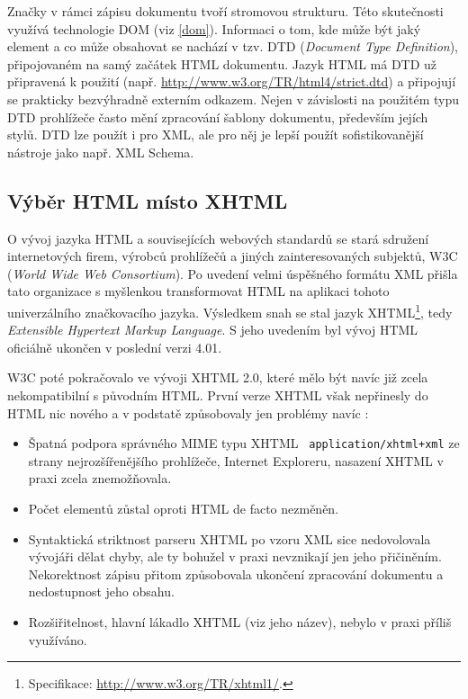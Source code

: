 Značky v rámci zápisu dokumentu tvoří stromovou strukturu. Této
skutečnosti využívá technologie DOM (viz \ref{dom}). Informaci
o tom, kde může být jaký element a co může obsahovat se nachází v
tzv. DTD ({\it Document Type Definition}), připojovaném na samý
začátek HTML dokumentu. Jazyk HTML má DTD už připravená k použití
(např. \url{http://www.w3.org/TR/html4/strict.dtd}) a připojují se
prakticky bezvýhradně externím odkazem. Nejen v závislosti na
použitém typu DTD prohlížeče často mění zpracování šablony dokumentu,
především jejích stylů. DTD lze použít i pro XML, ale pro něj je lepší
použít sofistikovanější nástroje jako např. XML Schema. 

\subsection{Výběr HTML místo XHTML}
O vývoj jazyka HTML a souvisejících webových standardů se stará
sdružení internetových firem, výrobců prohlížečů a jiných
zainteresovaných subjektů, W3C ({\it World Wide Web Consortium}). Po
uvedení velmi úspěšného formátu XML přišla tato organizace s
myšlenkou transformovat HTML na aplikaci tohoto univerzálního
značkovacího jazyka. Výsledkem snah se stal jazyk
XHTML\footnote{Specifikace: \url{http://www.w3.org/TR/xhtml1/}.}, tedy
{\it Extensible Hypertext Markup Language}. S jeho uvedením byl vývoj
 HTML oficiálně ukončen v poslední verzi 4.01.

W3C poté pokračovalo ve vývoji XHTML 2.0, které mělo být navíc již
zcela nekompatibilní s původním HTML. První verze XHTML však
nepřinesly do HTML nic nového a v podstatě způsobovaly jen problémy
navíc \cite{xhtml}:

\begin{itemize}
	\item Špatná podpora správného MIME typu XHTML {\tt
	application/xhtml+xml} ze strany nejrozšířenějšího prohlížeče,
	Internet Exploreru, nasazení  XHTML v praxi zcela
	znemožňovala.
	\item Počet elementů zůstal oproti HTML de facto nezměněn.
	\item Syntaktická striktnost parseru XHTML po vzoru XML sice
	nedovolovala vývojáři dělat chyby, ale ty bohužel v praxi nevznikají
	jen jeho přičiněním. Nekorektnost zápisu přitom způsobovala ukončení
	zpracování dokumentu a nedostupnost jeho obsahu.
	\item Rozšiřitelnost, hlavní lákadlo XHTML (viz jeho název), nebylo
	v praxi příliš využíváno. 
\end{itemize}

